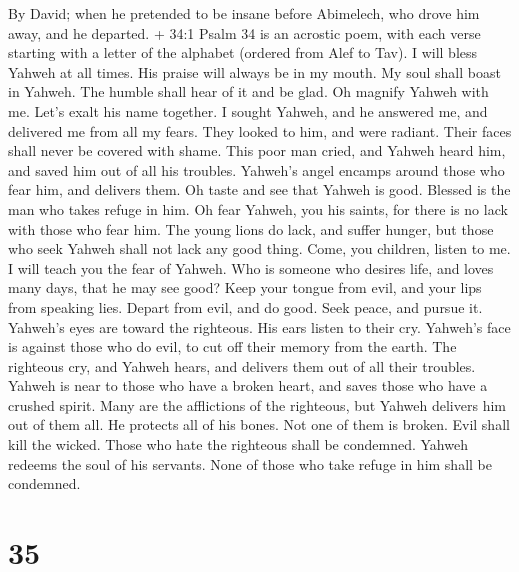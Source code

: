 By David; when he pretended to be insane before Abimelech, who drove him
away, and he departed.  + 34:1 Psalm 34 is an acrostic poem,
with each verse starting with a letter of the alphabet (ordered from
Alef to Tav). I will bless Yahweh at all times. His praise will always
be in my mouth.  My soul shall boast in Yahweh. The humble
shall hear of it and be glad.  Oh magnify Yahweh with me.
Let's exalt his name together.  I sought Yahweh, and he
answered me, and delivered me from all my fears.  They
looked to him, and were radiant. Their faces shall never be covered with
shame.  This poor man cried, and Yahweh heard him, and saved
him out of all his troubles.  Yahweh's angel encamps around
those who fear him, and delivers them.  Oh taste and see
that Yahweh is good. Blessed is the man who takes refuge in him.
 Oh fear Yahweh, you his saints, for there is no lack with
those who fear him.  The young lions do lack, and suffer
hunger, but those who seek Yahweh shall not lack any good thing.
 Come, you children, listen to me. I will teach you the
fear of Yahweh.  Who is someone who desires life, and loves
many days, that he may see good?  Keep your tongue from
evil, and your lips from speaking lies.  Depart from evil,
and do good. Seek peace, and pursue it.  Yahweh's eyes are
toward the righteous. His ears listen to their cry. 
Yahweh's face is against those who do evil, to cut off their memory from
the earth.  The righteous cry, and Yahweh hears, and
delivers them out of all their troubles.  Yahweh is near to
those who have a broken heart, and saves those who have a crushed
spirit.  Many are the afflictions of the righteous, but
Yahweh delivers him out of them all.  He protects all of
his bones. Not one of them is broken.  Evil shall kill the
wicked. Those who hate the righteous shall be condemned. 
Yahweh redeems the soul of his servants. None of those who take refuge
in him shall be condemned.

\hypertarget{section-34}{%
\section{35}\label{section-34}}

